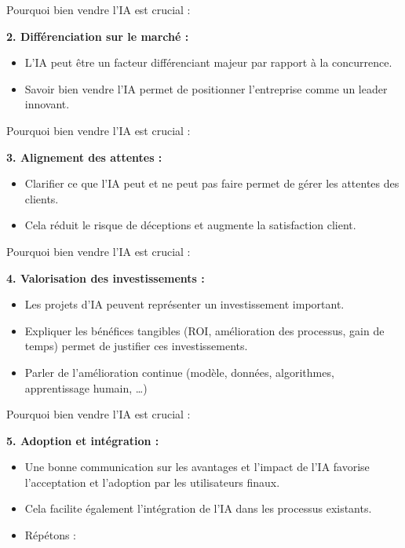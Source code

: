 \begin{frame}{Pourquoi bien vendre l'IA est crucial :}

\textbf{2. Différenciation sur le marché :}
\begin{itemize}
    \item L'IA peut être un facteur différenciant majeur par rapport à la concurrence.
    \item Savoir bien vendre l'IA permet de positionner l'entreprise
      comme un leader innovant.
\end{itemize}
\end{frame}

\begin{frame}{Pourquoi bien vendre l'IA est crucial :}

\textbf{3. Alignement des attentes :}
\begin{itemize}
    \item Clarifier ce que l'IA peut et ne peut pas faire permet de gérer les attentes des clients.
    \item Cela réduit le risque de déceptions et augmente la satisfaction client.
\end{itemize}
\end{frame}

\begin{frame}{Pourquoi bien vendre l'IA est crucial :}

\textbf{4. Valorisation des investissements :}
\begin{itemize}
\item Les projets d'IA peuvent représenter un investissement
  important.
\item Expliquer les bénéfices tangibles (ROI, amélioration des
  processus, gain de temps) permet de justifier ces
  investissements.
\item Parler de l'amélioration continue (modèle, données, algorithmes,
  apprentissage humain, \dots)
\end{itemize}
\end{frame}

\begin{frame}{Pourquoi bien vendre l'IA est crucial :}

\textbf{5. Adoption et intégration :}
\begin{itemize}
\item Une bonne communication sur les avantages et l'impact de l'IA
  favorise l'acceptation et l'adoption par les utilisateurs finaux.
\item Cela facilite également l'intégration de l'IA dans les processus
  existants.
\item Répétons : 
\end{itemize}
\end{frame}

